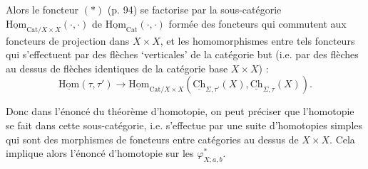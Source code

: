 \documentclass[11pt]{article}
\newcommand{\uHom}{\underline{\mathrm{Hom}}}
\newcommand{\uCh}{\underline{\mathrm{Ch}}}
\begin{document}
Alors le foncteur $(*)$ (p. 94) se factorise par la sous-catégorie $\uHom_{\mathrm{Cat}/X\times X}(\cdot,\cdot)$ de $\uHom_{\mathrm{Cat}}(\cdot,\cdot)$ formée des foncteurs qui commutent aux foncteurs de projection dans $X\times X$, et les homomorphismes entre tels foncteurs qui s'effectuent par des flèches `verticales' de la catégorie but (i.e. par des flèches au dessus de flèches identiques de la catégorie base $X\times X$) :
\[
\uHom(\tau,\tau')\longrightarrow\uHom_{\mathrm{Cat}/X\times X}(\uCh_{\Sigma,\tau'}(X),\uCh_{\Sigma,\tau}(X)).
\]

Donc dans l'énoncé du théorème d'homotopie, on peut préciser que l'homotopie se fait dans cette sous-catégorie, i.e. s'effectue par une suite d'homotopies simples qui sont des morphismes de foncteurs entre catégories au dessus de $X\times X$. Cela implique alors l'énoncé d'homotopie sur les $\varphi^*_{X;a,b}$.
\end{document}
